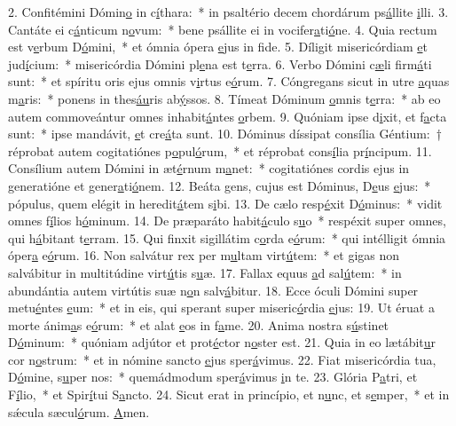 2. Confitémini Dómin\uline{o} in c\uline{í}thara:~* in psaltério decem chordárum ps\uline{á}llite \uline{i}lli.
3. Cantáte ei c\uline{á}nticum n\uline{o}vum:~* bene psállite ei in vocifer\uline{a}ti\uline{ó}ne.
4. Quia rectum est v\uline{e}rbum D\uline{ó}mini,~* et ómnia ópera \uline{e}jus in f\uline{i}de.
5. Díligit misericórdiam \uline{e}t jud\uline{í}cium:~* misericórdia Dómini pl\uline{e}na est t\uline{e}rra.
6. Verbo Dómini c\uline{æ}li firm\uline{á}ti sunt:~* et spíritu oris ejus omnis v\uline{i}rtus e\uline{ó}rum.
7. Cóngregans sicut in utre \uline{a}quas m\uline{a}ris:~* ponens in thes\uline{áu}ris ab\uline{ý}ssos.
8. Tímeat Dóminum \uline{o}mnis t\uline{e}rra:~* ab eo autem commoveántur omnes inhabit\uline{á}ntes \uline{o}rbem.
9. Quóniam ipse d\uline{i}xit, et f\uline{a}cta sunt:~* ipse mandávit, \uline{e}t cre\uline{á}ta sunt.
10. Dóminus díssipat consília Géntium:~† réprobat autem cogitatiónes p\uline{o}pul\uline{ó}rum,~* et réprobat cons\uline{í}lia pr\uline{í}ncipum.
11. Consílium autem Dómini in æt\uline{é}rnum m\uline{a}net:~* cogitatiónes cordis ejus in generatióne et gener\uline{a}ti\uline{ó}nem.
12. Beáta gens, cujus est Dóminus, D\uline{e}us \uline{e}jus:~* pópulus, quem elégit in heredit\uline{á}tem s\uline{i}bi.
13. De cælo resp\uline{é}xit D\uline{ó}minus:~* vidit omnes f\uline{í}lios h\uline{ó}minum.
14. De præparáto habit\uline{á}culo s\uline{u}o~* respéxit super omnes, qui h\uline{á}bitant t\uline{e}rram.
15. Qui finxit sigillátim c\uline{o}rda e\uline{ó}rum:~* qui intélligit ómnia óper\uline{a} e\uline{ó}rum.
16. Non salvátur rex per m\uline{u}ltam virt\uline{ú}tem:~* et gigas non salvábitur in multitúdine virt\uline{ú}tis s\uline{u}æ.
17. Fallax equus \uline{a}d sal\uline{ú}tem:~* in abundántia autem virtútis suæ n\uline{o}n salv\uline{á}bitur.
18. Ecce óculi Dómini super metu\uline{é}ntes \uline{e}um:~* et in eis, qui sperant super miseric\uline{ó}rdia \uline{e}jus:
19. Ut éruat a morte ánim\uline{a}s e\uline{ó}rum:~* et alat \uline{e}os in f\uline{a}me.
20. Anima nostra s\uline{ú}stinet D\uline{ó}minum:~* quóniam adjútor et prot\uline{é}ctor n\uline{o}ster est.
21. Quia in eo lætábit\uline{u}r cor n\uline{o}strum:~* et in nómine sancto \uline{e}jus sper\uline{á}vimus.
22. Fiat misericórdia tua, D\uline{ó}mine, s\uline{u}per nos:~* quemádmodum sper\uline{á}vimus \uline{i}n te.
23. Glória P\uline{a}tri, et F\uline{í}lio,~* et Spir\uline{í}tui S\uline{a}ncto.
24. Sicut erat in princípio, et n\uline{u}nc, et s\uline{e}mper,~* et in sǽcula sæcul\uline{ó}rum. \uline{A}men.
